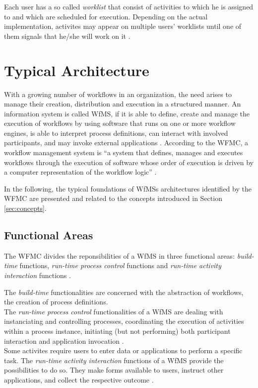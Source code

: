     Each user has a so called \emph{worklist} that consist of activities to which he is assigned to and which are scheduled for execution. Depending on the actual implementation, activites may appear on multiple users' worklists until one of them signals that he/she will work on it \cite{Hollingsworth1995Wfmc,Casati1999Specification}.


\section{Typical Architecture} %
\label{sec:typical_architecture}
  With a growing number of workflows in an organization, the need arises to manage their creation, distribution and execution in a structured manner. An information system is called \ac{WfMS}, if it is able to define, create and manage the execution of workflows by using software that runs on one or more workflow engines, is able to interpret process definitions, can interact with involved participants, and may invoke external applications \cite{Lawrence1997Workflow}. According to the \ac{WFMC}, a workflow management system is ``a system that defines, manages and executes workflows through the execution of software whose order of execution is driven by a computer representation of the workflow logic'' \cite{Hollingsworth1995Wfmc}.

  In the following, the typical foundations of \ac{WfMS}s architectures identified by the \ac{WFMC} are presented and related to the concepts introduced in Section \ref{sec:concepts}.

  \subsection{Functional Areas} %
  \label{sub:functional_areas}
    The \ac{WFMC} divides the reponsibilities of a \ac{WfMS} in three functional areas: \emph{build-time} functions, \emph{run-time process control} functions and \emph{run-time activity interaction} functions \cite{Hollingsworth1995Wfmc,Alonso1997Functionality}.

    The \emph{build-time} functionalities are concerned with the abstraction of workflows, \ie the creation of process definitions.\\
    The \emph{run-time process control} functionalities of a \ac{WfMS} are dealing with instanciating and controlling processes, coordinating the execution of activities within a process instance, initiating (but not performing) both participant interaction and application invocation \cite{Hollingsworth1995Wfmc}.\\
    Some activites require users to enter data or applications to perform a specific task. The \emph{run-time activity interaction} functions of a \ac{WfMS} provide the possibilities to do so. They make forms available to users, instruct other applications, and collect the respective outcome \cite{Hollingsworth1995Wfmc}.

